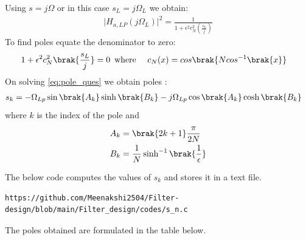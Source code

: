 \documentclass{article}
\begin{document}
\begin{enumerate}
Using $s=j\Omega$ or in this case $s_{L}=j\Omega_{L}$ we obtain:
\begin{align}
    \vert H_{a,LP}(j\Omega_L)\vert^2 = \frac{1}{1 + \epsilon^2c_N^2(\frac{s_L}{j})}
\end{align}
To find poles equate the denominator to zero:
\begin{align}
    {1 + \epsilon^2c_N^2\brak{\frac{s_L}{j}}} &=0\hspace{5pt }
    \text{where } \hspace{10pt} c_N(x) = cos\brak{Ncos^{-1}\brak{x}} \label{eq:pole_ques}
\end{align}
On solving \eqref{eq:pole_ques} we obtain poles :
\begin{align}
    s_{k} &= -\Omega_{Lp} \sin\brak{A_k}\sinh\brak{B_k} - j\Omega_{Lp}\cos\brak{A_k}\cosh\brak{B_k}
\end{align}
where $k$ is the index of the pole and \\
\begin{align}
    A_k &= \brak{2k+1}\frac{\pi}{2N}\\
    B_k &= \frac{1}{N} \sinh^{-1}\brak{\frac{1}{\epsilon}}
\end{align}

The below code computes the values of $s_k$ and stores it in a text file. 
\begin{lstlisting}
https://github.com/Meenakshi2504/Filter-design/blob/main/Filter_design/codes/s_n.c
\end{lstlisting}
The poles obtained are formulated in the table below.



\end{enumerate}
\end{document}
